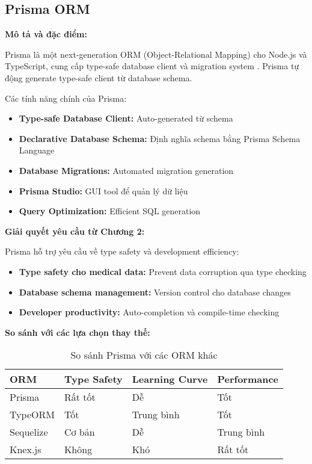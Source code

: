\documentclass[../DoAn.tex]{subfiles}
\begin{document}
\subsection{Prisma ORM}
\label{subsection:3.3.2}

\textbf{Mô tả và đặc điểm:}

Prisma là một next-generation ORM (Object-Relational Mapping) cho Node.js và TypeScript, cung cấp type-safe database client và migration system \cite{prisma}. Prisma tự động generate type-safe client từ database schema.

Các tính năng chính của Prisma:
\begin{itemize}
    \item \textbf{Type-safe Database Client:} Auto-generated từ schema
    \item \textbf{Declarative Database Schema:} Định nghĩa schema bằng Prisma Schema Language
    \item \textbf{Database Migrations:} Automated migration generation
    \item \textbf{Prisma Studio:} GUI tool để quản lý dữ liệu
    \item \textbf{Query Optimization:} Efficient SQL generation
\end{itemize}

\textbf{Giải quyết yêu cầu từ Chương 2:}

Prisma hỗ trợ yêu cầu về type safety và development efficiency:
\begin{itemize}
    \item \textbf{Type safety cho medical data:} Prevent data corruption qua type checking
    \item \textbf{Database schema management:} Version control cho database changes
    \item \textbf{Developer productivity:} Auto-completion và compile-time checking
\end{itemize}

\textbf{So sánh với các lựa chọn thay thế:}

\begin{table}[H]
\centering
\begin{tabular}{|p{3cm}|p{3cm}|p{3cm}|p{4cm}|}
\hline
\textbf{ORM} & \textbf{Type Safety} & \textbf{Learning Curve} & \textbf{Performance} \\
\hline
Prisma & Rất tốt & Dễ & Tốt \\
\hline
TypeORM & Tốt & Trung bình & Tốt \\
\hline
Sequelize & Cơ bản & Dễ & Trung bình \\
\hline
Knex.js & Không & Khó & Rất tốt \\
\hline
\end{tabular}
\caption{So sánh Prisma với các ORM khác}
\end{table}
\end{document}
